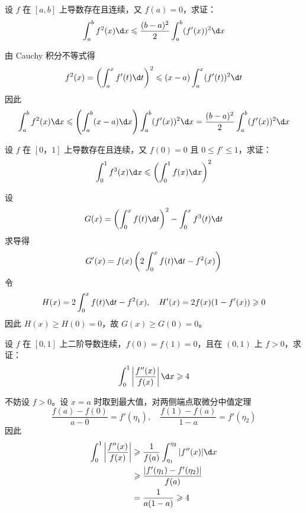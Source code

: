 \begin{problem}[000056]
设 $f$ 在 $[a, b]$ 上导数存在且连续，又 $f(a) = 0$，求证：
\[ \int_{a}^{b} f^2(x) \d x \leqslant \frac{(b-a)^2}{2} \int_{a}^{b} (f'(x))^2 \d x \]
\end{problem}

\begin{solution}
	由 Cauchy 积分不等式得
	\[
		f^2(x)  = \left(\int_{a}^{x} f'(t) \d t\right)^2
		\leqslant (x-a) \int_{a}^{x} (f'(t))^2 \d t
	\]
	因此
	\[ \int_{a}^{b} f^2(x) \d x \leqslant \left(\int_{a}^{b} (x-a) \d x \right) \int_{a}^{b} (f'(x))^2 \d x = \frac{(b-a)^2}{2} \int_{a}^{b} (f'(x))^2 \d x \]
\end{solution}

\begin{problem}[000057]
设 $f$ 在 $[0， 1]$ 上导数存在且连续，又 $f(0) = 0$ 且 $0 \leqslant f' \leqslant 1$，求证：
\[ \int_{0}^{1} f^3(x) \d x \leqslant \left(\int_{0}^{1} f(x) \d x\right)^2 \]
\end{problem}

\begin{solution}
	设
	\[ G(x) =  \left(\int_{0}^{x} f(t) \d t\right)^2 - \int_{0}^{x} f^3(t) \d t \]
	求导得
	\[ G'(x) = f(x) \left(2 \int_{0}^{x} f(t) \d t - f^2(x)\right) \]
	令
	\[ H(x) = 2 \int_{0}^{x} f(t) \d t - f^2(x), \quad H'(x) = 2f(x)(1 - f'(x)) \geqslant 0 \]
	因此 $H(x) \geqslant H(0) = 0$，故 $G(x) \geqslant G(0) = 0$。
\end{solution}

\begin{problem}[000058]
设 $f$ 在 $[0, 1]$ 上二阶导数连续，$f(0) = f(1) = 0$，且在 $(0, 1)$ 上 $f > 0$，求证：
\[ \int_{0}^{1} \left|\frac{f''(x)}{f(x)}\right| \d x \geqslant 4 \]
\end{problem}

\begin{solution}
	不妨设 $f > 0$。设 $x = a$ 时取到最大值，对两侧端点取微分中值定理
	\[ \frac{f(a) - f(0)}{a - 0} = f'(\eta_1), \quad \frac{f(1) - f(a)}{1 - a} = f'(\eta_2) \]
	因此
	\[ \begin{aligned}
			\int_{0}^{1} \left|\frac{f''(x)}{f(x)}\right|
			 & \geqslant \frac{1}{f(a)} \int_{\eta_1}^{\eta_2} |f''(x)| \d x \\
			 & \geqslant \frac{|f'(\eta_1) - f'(\eta_2)|}{f(a)}              \\
			 & = \frac{1}{a(1-a)} \geqslant 4
		\end{aligned} \]
\end{solution}

